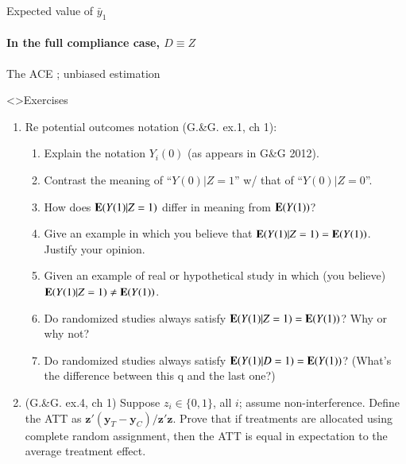 \begin{frame}{Expected value of $\bar{y}_{1}$}
\framesubtitle{In the full compliance case, $D \equiv Z$}
  
\end{frame}

\begin{frame}{The ACE ; unbiased estimation}
  
\end{frame}

\begin{frame}<\nottheirhandout>{Exercises}
  \begin{enumerate}
  \item Re potential outcomes notation {}(G.\&G. ex.1, ch 1):
    \begin{enumerate}
    \item Explain the notation $Y_{i}(0)$ (as appears in G\&G 2012).
    \item Contrast the meaning of ``$Y(0) | Z=1$'' w/ that of ``$Y(0) | Z=0$''.
    \item How does $\mathbf{E}(Y(1) | Z=1)$ differ in meaning from $\mathbf{E}(Y(1))$?
    \item Give an example in which you believe that $\mathbf{E}(Y(1) | Z=1) =
      \mathbf{E}(Y(1))$.  Justify your opinion. 
    \item Given an example of real or hypothetical study in which (you
      believe)$\mathbf{E}(Y(1) | Z=1) \neq \mathbf{E}(Y(1))$.
    \item Do randomized studies always satisfy $\mathbf{E}(Y(1) | Z=1)
      = \mathbf{E}(Y(1))$?  Why or why not?
    \item Do randomized studies always satisfy $\mathbf{E}(Y(1) | D=1)
      = \mathbf{E}(Y(1))$?  (What's the difference between this q and
      the last one?)
    \end{enumerate}
\item (G.\&G. ex.4, ch 1) Suppose $z_{i} \in \{0,1\}$, all $i$; assume non-interference. Define the ATT as $\mathbf{z}'(\mathbf{y}_{T}-\mathbf{y}_{C})/\mathbf{z}'\mathbf{z}$.  Prove that if treatments are allocated using complete random assignment, then the ATT is equal in expectation to the average treatment effect.
  \end{enumerate}

\end{frame}

